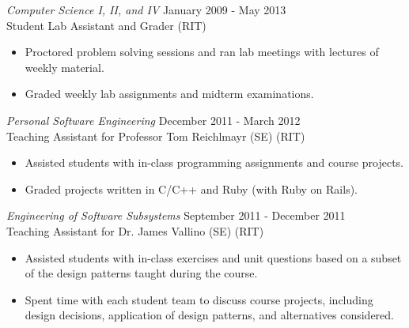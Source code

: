 \documentclass[10pt]{res} %
\begin{document}
\begin{resume}
{\sl Computer Science I, II, and IV} \hfill January 2009 - May 2013 \\
Student Lab Assistant and Grader \hfill (RIT)
\begin{itemize} \itemsep -2pt %
\item Proctored problem solving sessions and ran lab meetings with lectures of weekly material.
\item Graded weekly lab assignments and midterm examinations.
\end{itemize}

{\sl Personal Software Engineering} \hfill December 2011 - March 2012 \\
Teaching Assistant for Professor Tom Reichlmayr (SE) \hfill (RIT)
\begin{itemize} \itemsep -2pt %
\item Assisted students with in-class programming assignments and course projects.
\item Graded projects written in C/C++ and Ruby (with Ruby on Rails).
\end{itemize}

{\sl Engineering of Software Subsystems} \hfill September 2011 - December 2011 \\
Teaching Assistant for Dr. James Vallino (SE) \hfill (RIT)
\begin{itemize} \itemsep -2pt %
\item Assisted students with in-class exercises and unit questions based on a subset of the design patterns taught during the course.
\item Spent time with each student team to discuss course projects, including design decisions, application of design patterns, and alternatives considered.
\end{itemize}






\end{resume}
\end{document}
